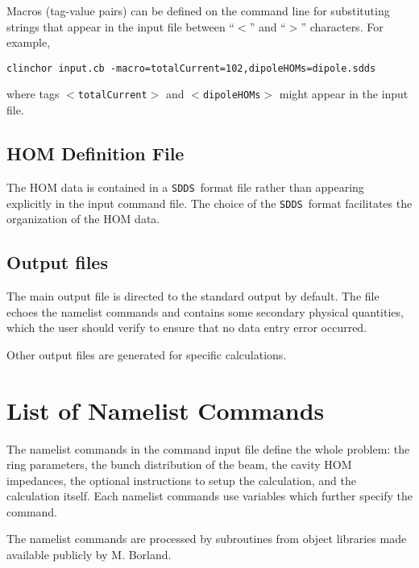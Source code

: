 \documentclass[11pt]{article}
\newcommand{\SDDS}{{\tt SDDS}}
\begin{document}
Macros (tag-value pairs) can be defined on the command line for substituting strings that appear in the input file between ``$<$'' and ``$>$'' characters. For example,
\begin{verbatim}
clinchor input.cb -macro=totalCurrent=102,dipoleHOMs=dipole.sdds
\end{verbatim}
where tags $<${\tt totalCurrent}$>$ and  $<${\tt dipoleHOMs}$>$ might appear in the input file.

\subsection{HOM Definition File}
The HOM data is contained in a \SDDS\ format file rather than
appearing explicitly in the input command file.  The choice of the
\SDDS\ format facilitates the organization of the HOM data.


\subsection{Output files}
The main output file is directed to the standard
output by default. The file echoes the namelist commands and contains some
secondary physical quantities, which the user should verify to ensure
that no data entry error occurred.  

Other output files are generated for specific calculations.


\section{List of Namelist Commands} \label{sect:namelists}
The namelist commands in the command input file define the whole
problem: the ring parameters, the bunch distribution of the beam, the
cavity HOM impedances, the optional instructions to setup the
calculation, and the calculation itself. Each namelist commands use
variables which further specify the command.

The namelist commands are processed by subroutines from object
libraries made available publicly by M. Borland.
\end{document}
